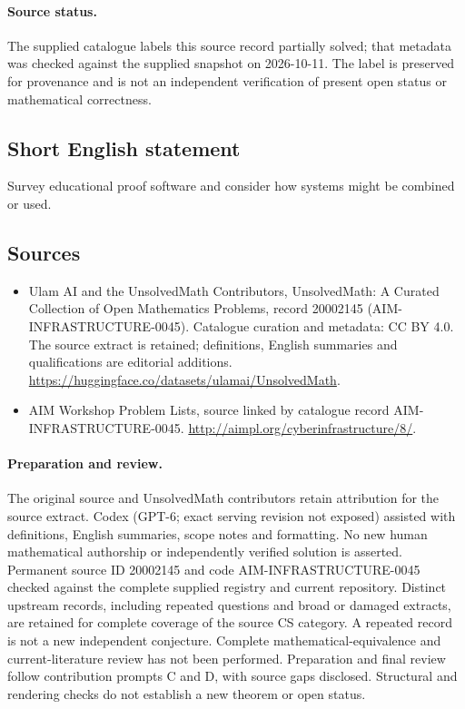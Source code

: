 \documentclass[11pt]{article}
\begin{document}
\paragraph{Source status.}
The supplied catalogue labels this source record partially solved; that metadata was checked against the supplied snapshot on 2026-10-11. The label is preserved for provenance and is not an independent verification of present open status or mathematical correctness.
\subsection{Short English statement}
Survey educational proof software and consider how systems might be combined or used.
\subsection{Sources}
\begin{itemize}
\item[\hypertarget{source:20002145:1}{S1}] Ulam AI and the UnsolvedMath Contributors, UnsolvedMath: A Curated Collection of Open Mathematics Problems, record 20002145 (AIM-INFRASTRUCTURE-0045). Catalogue curation and metadata: CC BY 4.0. The source extract is retained; definitions, English summaries and qualifications are editorial additions.
\url{https://huggingface.co/datasets/ulamai/UnsolvedMath}.
\item[\hypertarget{source:20002145:2}{S2}] AIM Workshop Problem Lists, source linked by catalogue record AIM-INFRASTRUCTURE-0045.
\url{http://aimpl.org/cyberinfrastructure/8/}.
\end{itemize}
\paragraph{Preparation and review.}
The original source and UnsolvedMath contributors retain attribution for the source extract. Codex (GPT-6; exact serving revision not exposed) assisted with definitions, English summaries, scope notes and formatting. No new human mathematical authorship or independently verified solution is asserted. Permanent source ID 20002145 and code AIM-INFRASTRUCTURE-0045 checked against the complete supplied registry and current repository. Distinct upstream records, including repeated questions and broad or damaged extracts, are retained for complete coverage of the source CS category. A repeated record is not a new independent conjecture. Complete mathematical-equivalence and current-literature review has not been performed. Preparation and final review follow contribution prompts C and D, with source gaps disclosed. Structural and rendering checks do not establish a new theorem or open status.
\label{end:20002145}
\end{document}
